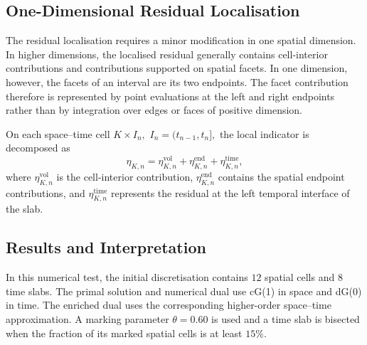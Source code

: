 \subsection{One-Dimensional Residual Localisation}
\label{sec:one-dimensional-localisation}

The residual localisation requires a minor modification in one spatial dimension. In higher dimensions, the localised residual generally contains cell-interior contributions and contributions supported on spatial facets. In one dimension, however, the facets of an interval are its two endpoints. The facet contribution therefore is represented by point evaluations at the left and right endpoints rather than by integration over edges or faces of positive dimension.

On each space--time cell
\(
  K\times I_n,
  \,\,
  I_n=(t_{n-1},t_n],
\)
the local indicator is decomposed as
\begin{equation}
  \eta_{K,n}
  =
  \eta_{K,n}^{\mathrm{vol}}
  +
  \eta_{K,n}^{\mathrm{end}}
  +
  \eta_{K,n}^{\mathrm{time}},
  \label{eq:1d-local-indicator-decomposition}
\end{equation}
where $\eta_{K,n}^{\mathrm{vol}}$ is the cell-interior contribution, $\eta_{K,n}^{\mathrm{end}}$ contains the spatial endpoint contributions, and $\eta_{K,n}^{\mathrm{time}}$ represents the residual at the left temporal interface of the slab.


\subsection{Results and Interpretation}

In this numerical test, the initial discretisation contains $12$ spatial cells and $8$ time slabs. The primal solution and numerical dual use cG(1) in space and dG(0) in time. The enriched dual uses the corresponding higher-order space--time approximation. A marking parameter \(\theta=0.60\) is used and a time slab is bisected when the fraction of its marked spatial cells is at least \(15\%\).

